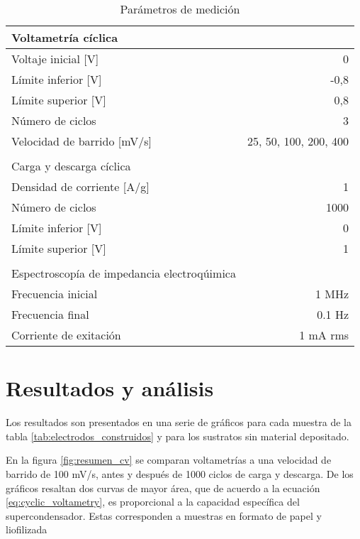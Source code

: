 \begin{table}[htbp]
	\centering
	\caption{Parámetros de medición}
	\begin{tabular}{ l r }
		Voltametría cíclica &  \\
		\hline
		Voltaje inicial [V] & 0 \\
		Límite inferior [V] & -0,8 \\
		Límite superior [V] & 0,8  \\
		Número de ciclos & 3 \\
		Velocidad de barrido [mV/s] & 25, 50, 100, 200, 400 \\
		& \\
		Carga y descarga cíclica & \\
		\hline
		Densidad de corriente [A/g] & 1 \\
		Número de ciclos & 1000 \\
		Límite inferior [V] & 0 \\
		Límite superior [V] & 1 \\
		& \\
		Espectroscopía de impedancia electroqúimica & \\
		\hline
		Frecuencia inicial	&	1 MHz \\
		Frecuencia final	&	0.1 Hz \\
		Corriente de exitación & 1 mA rms \\ 
	\end{tabular}
	\label{tab:elec_config}
\end{table}

\section{Resultados y análisis}
Los resultados son presentados en una serie de gráficos para cada muestra de la tabla \ref{tab:electrodos_construidos} y para los sustratos sin material depositado. 

En la figura \ref{fig:resumen_cv} se comparan voltametrías a una velocidad de barrido de 100 mV/s, antes y después de 1000 ciclos de carga y descarga. De los gráficos resaltan dos curvas de mayor área, que de acuerdo a la ecuación \ref{eq:cyclic_voltametry}, es proporcional a la capacidad específica del supercondensador. Estas corresponden a muestras en formato de papel y liofilizada

